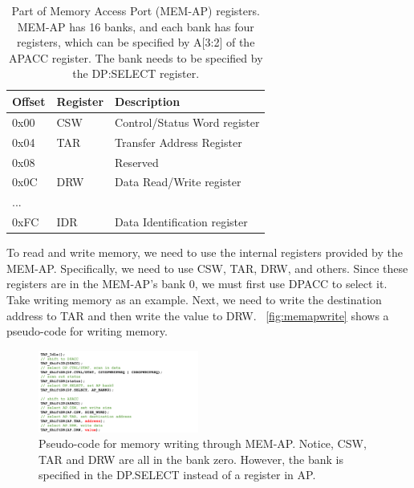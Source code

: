 \begin{center}
	\begin{table}
		\small
		\begin{tabular}{l l l} 
			\hline
			Offset & Register &  Description  \\ 
			\hline
			0x00 & CSW & Control/Status Word register \\
			\hline
			0x04 & TAR & Transfer Address Register \\
			\hline
			0x08 & & Reserved \\
			\hline
			0x0C & DRW & Data Read/Write register\\
			\hline
			... & & \\
			\hline
			0xFC & IDR & Data Identification register\\
			\hline
		\end{tabular}
		\caption{Part of Memory Access Port (MEM-AP) registers. MEM-AP has 16 banks, and each bank has four registers, which can be specified by A[3:2] of the APACC register. The bank needs to be specified by the DP:SELECT register.}
		\label{tab:memapreg}
	\end{table}
\end{center}





To read and write memory, we need to use the internal registers provided by the MEM-AP. Specifically, we need to use CSW, TAR, DRW, and others. Since these registers are in the MEM-AP's bank 0, we must first use DPACC to select it. Take writing memory as an example. Next, we need to write the destination address to TAR and then write the value to DRW. ~\autoref{fig:memapwrite} shows a pseudo-code for writing memory.


\begin{figure}[ht]
	\includegraphics[width=0.47\textwidth]{figures/memapwrite2}
	\centering
	\caption{Pseudo-code for memory writing through MEM-AP. Notice, CSW, TAR and DRW are all in the bank zero. However, the bank is specified in the DP.SELECT instead of a register in AP.}
	\label{fig:memapwrite}
\end{figure}




